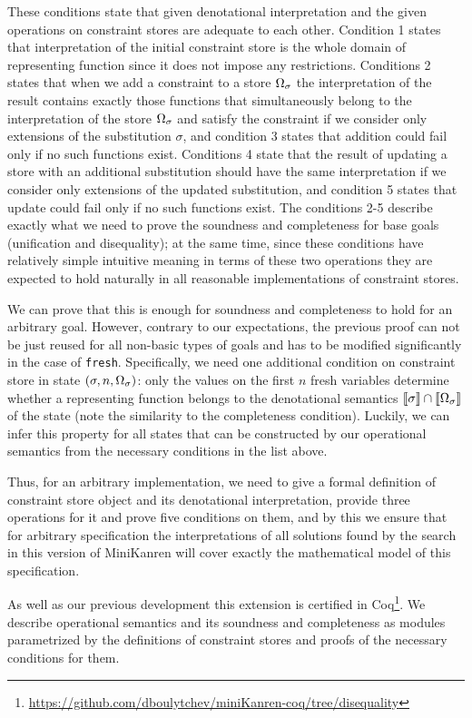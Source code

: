 These conditions state that given denotational interpretation and the given operations on constraint stores are adequate to each other.
Condition 1 states that interpretation of the initial constraint store is the whole domain of representing function since it does not impose any restrictions.
Conditions 2 states that when we add a constraint to a store $\Omega_\sigma$ the interpretation of the result contains exactly those functions that simultaneously belong to
the interpretation of the store $\Omega_\sigma$ and satisfy the constraint if we consider only extensions of the substitution $\sigma$,
and condition 3 states that addition could fail only if no such functions exist.
Conditions 4 state that the result of updating a store with an additional substitution should have the same interpretation if we consider only extensions of the updated substitution,
and condition 5 states that update could fail only if no such functions exist.
The conditions 2-5 describe exactly what we need to prove the soundness and completeness for base goals (unification and disequality); at the same time,
since these conditions have relatively simple intuitive meaning in terms of these two operations they are expected to hold naturally
in all reasonable implementations of constraint stores.

We can prove that this is enough for soundness and completeness to hold for an arbitrary goal. However,
contrary to our expectations, the previous proof can not be just reused for all non-basic types of goals and has to be modified
significantly in the case of \lstinline|fresh|. Specifically, we need one additional condition on constraint store in state $(\sigma, n, \Omega_\sigma)$:
only the values on the first $n$ fresh variables determine whether a representing function belongs to the denotational semantics $\llbracket{\sigma}\rrbracket \cap \llbracket{\Omega_\sigma}\rrbracket$
of the state (note the similarity to the completeness condition). Luckily, we can infer this property for all states that can be constructed by our operational
semantics from the necessary conditions in the list above.

Thus, for an arbitrary implementation, we need to give a formal definition of constraint store object and its denotational interpretation, provide three
operations for it and prove five conditions on them, and by this we ensure that for arbitrary specification the interpretations of all solutions found by the
search in this version of MiniKanren will cover exactly the mathematical model of this specification.

As well as our previous development this extension is certified in Coq\footnote{\url{https://github.com/dboulytchev/miniKanren-coq/tree/disequality}}. We describe operational semantics and its soundness and completeness as modules parametrized by the definitions of constraint
stores and proofs of the necessary conditions for them.
